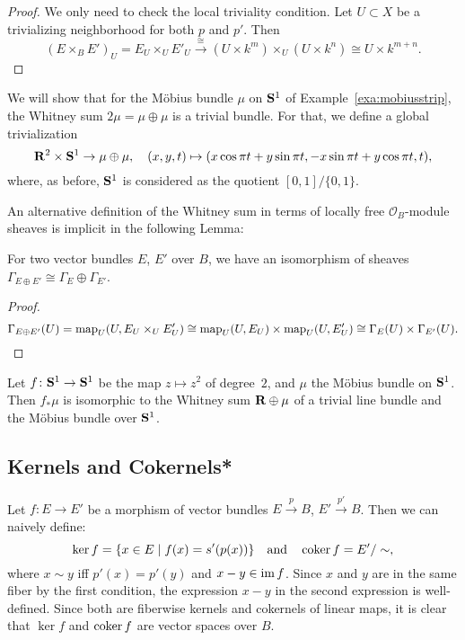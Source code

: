 \documentclass[a4paper,openany]{scrbook}
\begin{document}
\begin{proof}
We only need to check the local triviality condition. Let $U \subset X$ be a trivializing neighborhood for both $p$ and $p'$. Then
\[
(E \times_B E')_U = E_U \times_U E'_U \xrightarrow{\cong} (U \times k^m) \times_U (U \times k^n) \cong U \times k^{m+n}.
\]
\end{proof}

\begin{example}
We will show that for the Möbius bundle $\mu$ on $\S^1$ of Example~\ref{exa:mobiusstrip}, the Whitney sum $2\mu = \mu \oplus \mu$ is a trivial bundle. For that, we define a global trivialization
\[
\R^2 \times \S^1 \to \mu \oplus \mu, \quad (x,y,t) \mapsto (x \cos \pi t + y \sin \pi t,-x \sin \pi t + y \cos \pi t,t),
\]
where, as before, $\S^1$ is considered as the quotient $[0,1]/\{0,1\}$.
\end{example}

An alternative definition of the Whitney sum in terms of locally free $\mathcal O_B$-module sheaves is implicit in the following Lemma:

\begin{lemma}
For two vector bundles $E$, $E'$ over $B$, we have an isomorphism of sheaves $\Gamma_{E \oplus E'} \cong \Gamma_E \oplus \Gamma_{E'}$.
\end{lemma}
\begin{proof}
\[
\Gamma_{E \oplus E'}(U) = \map_U(U,E_U \times_U E'_U) \cong \map_U(U,E_U) \times \map_U(U,E'_U) \cong \Gamma_E(U) \times \Gamma_{E'}(U).
\]
\end{proof}

\begin{exer}
Let $f\colon \S^1 \to \S^1$ be the map $z \mapsto z^2$ of degree~$2$, and $\mu$ the Möbius bundle on $\S^1$. Then $f_*\mu$ is isomorphic to the Whitney sum $\R \oplus \mu$ of a trivial line bundle and the Möbius bundle over $\S^1$.
\end{exer}

\subsection{Kernels and Cokernels*}

Let $f\colon E \to E'$ be a morphism of vector bundles $E \xrightarrow{p} B$, $E' \xrightarrow{p'} B$. Then we can naively define:
\[
\ker f = \{x \in E \mid f(x)=s'(p(x))\} \quad \text{and} \quad \coker f = E'/\sim,
\]
where $x \sim y$ iff $p'(x) = p'(y)$ and $x-y \in \im f$. Since $x$ and $y$ are in the same fiber by the first condition, the expression $x-y$ in the second expression is well-defined. Since both are fiberwise kernels and cokernels of linear maps, it is clear that $\ker f$ and $\coker f$ are vector spaces over $B$.
\end{document}
